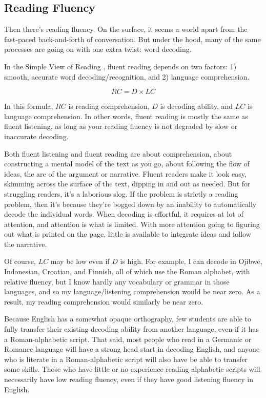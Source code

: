 \subsection{Reading Fluency}\label{sec:reading-fluency}

Then there's reading fluency. On the surface, it seems a world apart from the fast-paced back-and-forth of conversation. But under the hood, many of the same processes are going on with one extra twist: word decoding.

In the Simple View of Reading \citep{Gough1986}, fluent reading depends on two factors: 1) smooth, accurate word decoding/recognition, and 2) language comprehension.

\begin{equation}
    RC = D\times LC
\end{equation}

In this formula, $RC$ is reading comprehension, $D$ is decoding ability, and $LC$ is language comprehension. In other words, fluent reading is mostly the same as fluent listening, as long as your reading fluency is not degraded by slow or inaccurate decoding.

Both fluent listening and fluent reading are about comprehension, about constructing a mental model of the text as you go, about following the flow of ideas, the arc of the argument or narrative. Fluent readers make it look easy, skimming across the surface of the text, dipping in and out as needed. But for struggling readers, it's a laborious slog. If the problem is strictly a reading problem, then it's because they're bogged down by an inability to automatically decode the individual words. When decoding is effortful, it requires at lot of attention, and attention is what is limited. With more attention going to figuring out what is printed on the page, little is available to integrate ideas and follow the narrative.

Of course, $LC$ may be low even if $D$ is high. For example, I can decode in Ojibwe, Indonesian, Croatian, and Finnish, all of which use the Roman alphabet, with relative fluency, but I know hardly any vocabulary or grammar in those languages, and so my language/listening comprehension would be near zero. As a result, my reading comprehension would similarly be near zero.

Because English has a somewhat opaque orthography, few students are able to fully transfer their existing decoding ability from another language, even if it has a Roman-alphabetic script. That said, most people who read in a Germanic or Romance language will have a strong head start in decoding English, and anyone who is literate in a Roman-alphabetic script will also have be able to transfer some skills. Those who have little or no experience reading alphabetic scripts will necessarily have low reading fluency, even if they have good listening fluency in English.

